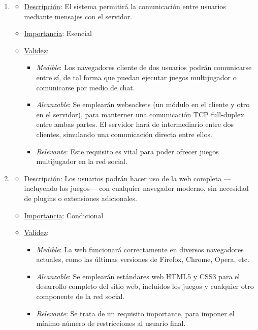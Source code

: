\begin{enumerate}
\item %
  \begin{itemize}
  \item \underline{Descripción}: El sistema permitirá la comunicación entre usuarios mediante mensajes con el servidor.
  \item \underline{Importancia}: Esencial
  \item \underline{Validez}:
    \begin{itemize}
    \item \textit{Medible}: Los navegadores cliente de dos usuarios podrán comunicarse entre sí, de tal forma que puedan ejecutar juegos multijugador o comunicarse por medio de chat.
    \item \textit{Alcanzable}: Se emplearán websockets (un módulo en el cliente y otro en el servidor), para manterner una comunicación TCP full-duplex entre ambas partes. El servidor hará de intermediario entre dos clientes, simulando una comunicación directa entre ellos.
    \item \textit{Relevante}: Este requisito es vital para poder ofrecer juegos multijugador en la red social.
    \end{itemize}
  \end{itemize}

\item %
  \begin{itemize}
  \item \underline{Descripción}: Los usuarios podrán hacer uso de la web completa ---incluyendo los juegos--- con cualquier navegador moderno, sin necesidad de plugins o extensiones adicionales.
  \item \underline{Importancia}: Condicional
  \item \underline{Validez}:
    \begin{itemize}
    \item \textit{Medible}: La web funcionará correctamente en diversos navegadores actuales, como las últimas versiones de Firefox, Chrome, Opera, etc.
    \item \textit{Alcanzable}: Se emplearán estándares web HTML5 y CSS3 para el desarrollo completo del sitio web, incluidos los juegos y cualquier otro componente de la red social.
    \item \textit{Relevante}: Se trata de un requisito importante, para imponer el mínimo número de restricciones al usuario final.
    \end{itemize}
  \end{itemize}



\end{enumerate}
